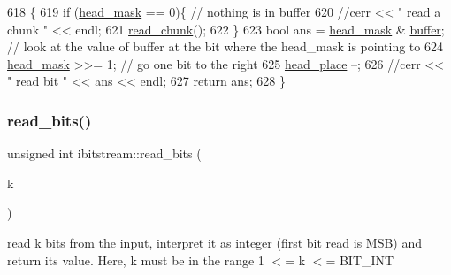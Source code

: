 \begin{DoxyCode}
618                          \{
619   \textcolor{keywordflow}{if} (\hyperlink{classibitstream_a48cd41991b6c29ea5120b53873a72a70}{head\_mask} == 0)\{ \textcolor{comment}{// nothing is in buffer}
620     \textcolor{comment}{//cerr << " read a chunk " << endl;}
621     \hyperlink{classibitstream_ac62c26004436d83f337f4aeba0895e20}{read\_chunk}();
622   \}
623   \textcolor{keywordtype}{bool} ans = \hyperlink{classibitstream_a48cd41991b6c29ea5120b53873a72a70}{head\_mask} & \hyperlink{classibitstream_a73f0b24d3d4402369f1abbb43f7f70ef}{buffer}; \textcolor{comment}{// look at the value of buffer at the bit where the
       head\_mask is pointing to}
624   \hyperlink{classibitstream_a48cd41991b6c29ea5120b53873a72a70}{head\_mask} >>= 1; \textcolor{comment}{// go one bit to the right}
625   \hyperlink{classibitstream_a7b96359ac1534a5565e6e9b0cc53a0b3}{head\_place} --;
626   \textcolor{comment}{//cerr << " read bit " << ans << endl;}
627   \textcolor{keywordflow}{return} ans;
628 \}
\end{DoxyCode}
\mbox{\label{classibitstream_a2fdcaecf10fefa6942dcd5286a2696e0}} 
\subsubsection{\texorpdfstring{read\+\_\+bits()}{read\_bits()}\hspace{0.1cm}{\footnotesize\ttfamily [1/2]}}
{\footnotesize\ttfamily unsigned int ibitstream\+::read\+\_\+bits (\begin{DoxyParamCaption}\item[{unsigned int}]{k }\end{DoxyParamCaption})}



read k bits from the input, interpret it as integer (first bit read is M\+SB) and return its value. Here, k must be in the range 1 $<$= k $<$= B\+I\+T\+\_\+\+I\+NT 


